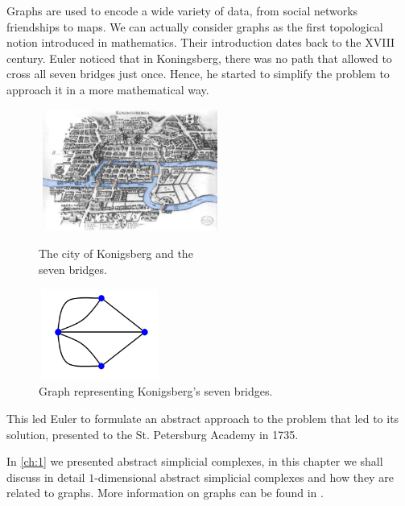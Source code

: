 \documentclass[../2.tex]{subfiles}
\begin{document}
    Graphs are used to encode a wide variety of data, from social networks friendships to maps.    
    We can actually consider graphs as the first topological notion introduced in mathematics.
    Their introduction dates back to the XVIII century.
    Euler noticed that in Koningsberg, there was no path that 
    allowed to cross all seven bridges just once. Hence, he started to simplify the problem to approach it in a more mathematical 
    way.
    \begin{figure}[H]
        \begin{minipage}{.5\textwidth}
            \centering
            \includegraphics[width=6cm, height=4cm]{sections/2/Bridge}
            \caption{The city of Konigsberg and the\\ seven bridges.}
            \label{fig:2:1}
        \end{minipage}
        \begin{minipage}{.5\textwidth}
            \centering
            \includegraphics[width=4cm, height=3cm]{sections/2/kgraph}
            \caption{Graph representing Konigsberg's seven bridges.}
            \label{fig:2:2}
        \end{minipage}
    \end{figure}

    This led Euler to formulate an abstract approach to the problem that led to its solution, presented to the St. Petersburg
    Academy in 1735.

    In \autoref{ch:1} we presented abstract simplicial complexes, in this chapter we shall discuss in detail
    $1$-dimensional abstract simplicial complexes and how they are related to graphs. More information
    on graphs can be found in \cite{bondy}.
\end{document}
